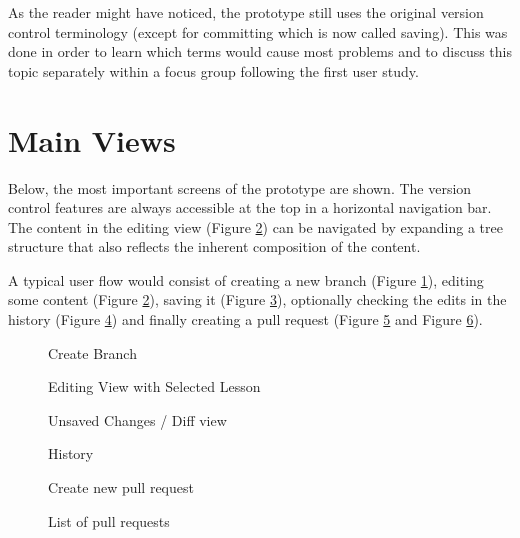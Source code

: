 As the reader might have noticed, the prototype still uses the original version control terminology (except for committing which is now called saving). This was done in order to learn which terms would cause most problems and to discuss this topic separately within a focus group following the first user study.

\section{Main Views}
Below, the most important screens of the prototype are shown. The version control features are always accessible at the top in a horizontal navigation bar. The content in the editing view (Figure \ref{fig:prot-initial-editor-view}) can be navigated by expanding a tree structure that also reflects the inherent composition of the content.

A typical user flow would consist of creating a new branch (Figure \ref{fig:create-branch}), editing some content (Figure \ref{fig:prot-initial-editor-view}), saving it (Figure \ref{fig:unsaved-changes}), optionally checking the edits in the history (Figure \ref{fig:history}) and finally creating a pull request (Figure \ref{fig:open-new-pr} and Figure \ref{fig:list-of-prs}).

\begin{figure}[h!]
 \centering
 \caption{Create Branch}
 \label{fig:create-branch}
\end{figure}


\begin{figure}[h!]
 \centering
 \caption{Editing View with Selected Lesson}
 \label{fig:prot-initial-editor-view}
\end{figure}

\begin{figure}[h!]
 \centering
 \caption{Unsaved Changes / Diff view}
 \label{fig:unsaved-changes}
\end{figure}

\begin{figure}[h!]
 \centering
 \caption{History}
 \label{fig:history}
\end{figure}

\begin{figure}[h!]
 \centering
 \caption{Create new pull request}
 \label{fig:open-new-pr}
\end{figure}

\begin{figure}[h!]
 \centering
 \caption{List of pull requests}
 \label{fig:list-of-prs}
\end{figure}
